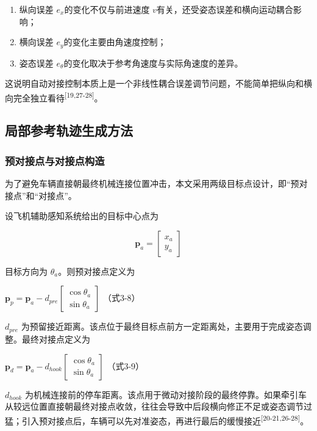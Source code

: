 \documentclass[UTF8,a4paper,12pt]{ctexart}
\begin{document}
\begin{enumerate}
\def\labelenumi{\arabic{enumi}.}
\item
  纵向误差 \(e_{x}\)的变化不仅与前进速度 \(v\)有关，还受姿态误差和横向运动耦合影响；
\item
  横向误差 \(e_{y}\)的变化主要由角速度控制；
\item
  姿态误差 \(e_{\theta}\)的变化取决于参考角速度与实际角速度的差异。
\end{enumerate}

这说明自动对接控制本质上是一个非线性耦合误差调节问题，不能简单把纵向和横向完全独立看待\textsuperscript{[19,27-28]}。

\subsection{局部参考轨迹生成方法}\label{_Toc228997203}

\subsubsection{预对接点与对接点构造}\label{_Toc228997204}

为了避免车辆直接朝最终机械连接位置冲击，本文采用两级目标点设计，即``预对接点''和``对接点''。

设飞机辅助感知系统给出的目标中心点为

\[\mathbf{p}_{a} = \left\lbrack \begin{array}{r}
x_{a} \\
y_{a}
\end{array} \right\rbrack
\]

目标方向为 \(\theta_{a}\)。则预对接点定义为

\(\mathbf{p}_{p} = \mathbf{p}_{a} - d_{pre}\left\lbrack \begin{array}{r}
\cos\theta_{a} \\
\sin\theta_{a}
\end{array} \right\rbrack\) （式3-8）

\(d_{pre}\) 为预留接近距离。该点位于最终目标点前方一定距离处，主要用于完成姿态调整。最终对接点定义为

\(\mathbf{p}_{d} = \mathbf{p}_{a} - d_{hook}\left\lbrack \begin{array}{r}
\cos\theta_{a} \\
\sin\theta_{a}
\end{array} \right\rbrack\) （式3-9）

\(d_{hook}\) 为机械连接前的停车距离。该点用于微动对接阶段的最终停靠。如果牵引车从较远位置直接朝最终对接点收敛，往往会导致中后段横向修正不足或姿态调节过猛；引入预对接点后，车辆可以先对准姿态，再进行最后的缓慢接近\textsuperscript{[20-21,26-28]}。
\end{document}
